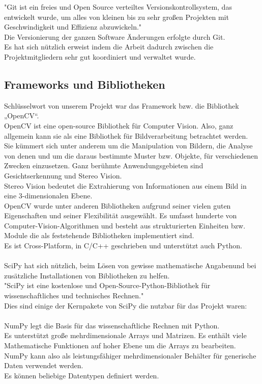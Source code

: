 "Git ist ein freies und Open Source verteiltes Versionskontrollsystem, das entwickelt wurde, um alles von kleinen bis zu sehr großen Projekten mit Geschwindigkeit und Effizienz abzuwickeln." \cite{Git1} \\
Die Versionierung der ganzen Software Änderungen erfolgte durch Git.\\
Es hat sich nützlich erweist indem die Arbeit dadurch zwischen die Projektmitgliedern sehr gut koordiniert und verwaltet wurde. \\ 


\subsection{Frameworks und Bibliotheken}

Schlüsselwort von unserem Projekt war das Framework bzw. die Bibliothek „OpenCV“.\\
OpenCV ist eine open-source Bibliothek für Computer Vision. Also, ganz allgemein kann sie als eine Bibliothek für Bildverarbeitung betrachtet werden.\\
Sie kümmert sich unter anderem um die Manipulation von Bildern, die Analyse von denen und um die daraus bestimmte Muster bzw. Objekte, für verschiedenen Zwecken einzusetzen. Ganz berühmte Anwendungsgebieten sind Gesichtserkennung und Stereo Vision. \\
Stereo Vision bedeutet die Extrahierung von Informationen aus einem Bild in eine 3-dimensionalen Ebene. \\
OpenCV wurde unter anderen Bibliotheken aufgrund seiner vielen guten Eigenschaften und seiner Flexibilität ausgewählt. Es umfasst hunderte von Computer-Vision-Algorithmen und besteht aus strukturierten Einheiten bzw. Module die als feststehende Bibliotheken implementiert sind. \\
Es ist Cross-Platform, in C/C++ geschrieben und unterstützt auch Python. \\
\cite{opencv_library}
\\


SciPy hat sich nützlich, beim Lösen von gewisse mathematische Angabenund bei zusätzliche Installationen von Bibliotheken zu helfen.\\ 
"SciPy ist eine kostenlose und Open-Source-Python-Bibliothek für wissenschaftliches und technisches Rechnen."\cite{2019arXiv190710121V-scipy}
 \\ 
Dies sind einige der Kernpakete von SciPy die nutzbar für das Projekt waren:\\ 
 \\ 
NumPy legt die Basis für das wissenschaftliche Rechnen mit Python.\\ Es unterstützt große mehrdimensionale Arrays und Matrizen. Es enthält viele Mathematische Funktionen auf hoher Ebene um die Arrays zu bearbeiten.\\
NumPy kann also als leistungsfähiger mehrdimensionaler Behälter für generische Daten verwendet werden.\\ Es können beliebige Datentypen definiert werden.


